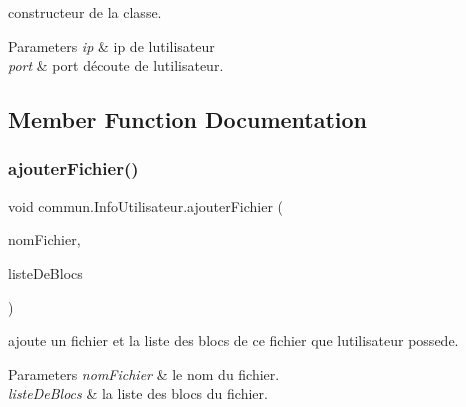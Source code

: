 constructeur de la classe. 


\begin{DoxyParams}{Parameters}
{\em ip} & ip de l\textquotesingle{}utilisateur \\
\hline
{\em port} & port d\textquotesingle{}écoute de l\textquotesingle{}utilisateur. \\
\hline
\end{DoxyParams}


\subsection{Member Function Documentation}
\mbox{\label{classcommun_1_1InfoUtilisateur_a49464d9eecf82d8768449eabc848aa39}} 
\subsubsection{\texorpdfstring{ajouter\+Fichier()}{ajouterFichier()}}
{\footnotesize\ttfamily void commun.\+Info\+Utilisateur.\+ajouter\+Fichier (\begin{DoxyParamCaption}\item[{String}]{nom\+Fichier,  }\item[{\hyperlink{classcommun_1_1ListeDeBlocs}{Liste\+De\+Blocs}}]{liste\+De\+Blocs }\end{DoxyParamCaption})\hspace{0.3cm}{\ttfamily [inline]}}



ajoute un fichier et la liste des blocs de ce fichier que l\textquotesingle{}utilisateur possede. 


\begin{DoxyParams}{Parameters}
{\em nom\+Fichier} & le nom du fichier. \\
\hline
{\em liste\+De\+Blocs} & la liste des blocs du fichier. \\
\hline
\end{DoxyParams}
\mbox{\label{classcommun_1_1InfoUtilisateur_a9f1e697ade23c76e070c55e03492b085}} 
